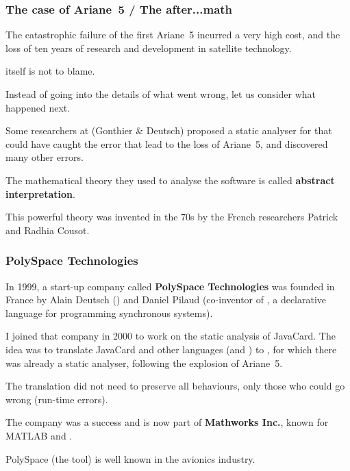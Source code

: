 \documentclass[compress,dvipdfmx]{beamer}
\begin{document}
\begin{frame}
  \frametitle{The case of Ariane~5 / The after...math}

  The catastrophic failure of the first Ariane~5 incurred a very high
  cost, and the loss of ten years of research and development in
  satellite technology.

  \bigskip

  \Ada itself is not to blame.

  \bigskip

  Instead of going into the details of what went wrong, let us
  consider what happened next.

  \bigskip

  Some researchers at \Inria (Gonthier \& Deutsch) proposed a static
  analyser for \Ada that could have caught the error that lead to the
  loss of Ariane~5, and discovered many other errors.

  \bigskip

  The mathematical theory they used to analyse the software is called
  \textbf{abstract interpretation}.

  \bigskip

  This powerful theory was invented in the 70s by the French
  researchers Patrick and Radhia Cousot.

\end{frame}


\begin{frame}
  \frametitle{PolySpace Technologies}

  In 1999, a start-up company called \textbf{PolySpace Technologies}
  was founded in France by Alain Deutsch (\Inria) and Daniel Pilaud
  (co\hyp{}inventor of \Lustre, a declarative language for programming
  synchronous systems).

  \bigskip

  I joined that company in 2000 to work on the static analysis of
  JavaCard. The idea was to translate JavaCard and other languages
  (\Clang and \Cpp) to \Ada, for which there was already a static
  analyser, following the explosion of Ariane~5.

  \bigskip

  The translation did not need to preserve all behaviours, only those
  who could go wrong (run\hyp{}time errors).

  \bigskip

  The company was a success and is now part of \textbf{Mathworks
    Inc.}, known for MATLAB and \Simulink.

  \bigskip

  PolySpace (the tool) is well known in the avionics industry.

\end{frame}
\end{document}
